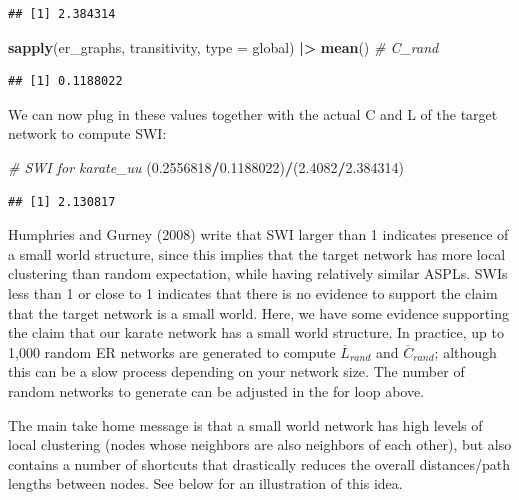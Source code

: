 \documentclass[
]{book}
\newenvironment{Shaded}{\begin{snugshade}}{\end{snugshade}}
\newcommand{\AttributeTok}[1]{\textcolor[rgb]{0.13,0.29,0.53}{#1}}
\newcommand{\CommentTok}[1]{\textcolor[rgb]{0.56,0.35,0.01}{\textit{#1}}}
\newcommand{\FloatTok}[1]{\textcolor[rgb]{0.00,0.00,0.81}{#1}}
\newcommand{\FunctionTok}[1]{\textcolor[rgb]{0.13,0.29,0.53}{\textbf{#1}}}
\newcommand{\NormalTok}[1]{#1}
\newcommand{\SpecialCharTok}[1]{\textcolor[rgb]{0.81,0.36,0.00}{\textbf{#1}}}
\newcommand{\StringTok}[1]{\textcolor[rgb]{0.31,0.60,0.02}{#1}}
\begin{document}
\begin{verbatim}
## [1] 2.384314
\end{verbatim}

\begin{Shaded}
\begin{Highlighting}[]
\FunctionTok{sapply}\NormalTok{(er\_graphs, transitivity, }\AttributeTok{type =} \StringTok{\textquotesingle{}global\textquotesingle{}}\NormalTok{) }\SpecialCharTok{|\textgreater{}} \FunctionTok{mean}\NormalTok{() }\CommentTok{\# C\_rand}
\end{Highlighting}
\end{Shaded}

\begin{verbatim}
## [1] 0.1188022
\end{verbatim}

We can now plug in these values together with the actual C and L of the target network to compute SWI:

\begin{Shaded}
\begin{Highlighting}[]
\CommentTok{\# SWI for karate\_uu }
\NormalTok{(}\FloatTok{0.2556818}\SpecialCharTok{/}\FloatTok{0.1188022}\NormalTok{)}\SpecialCharTok{/}\NormalTok{(}\FloatTok{2.4082}\SpecialCharTok{/}\FloatTok{2.384314}\NormalTok{)}
\end{Highlighting}
\end{Shaded}

\begin{verbatim}
## [1] 2.130817
\end{verbatim}

Humphries and Gurney (2008) write that SWI larger than 1 indicates presence of a small world structure, since this implies that the target network has more local clustering than random expectation, while having relatively similar ASPLs. SWIs less than 1 or close to 1 indicates that there is no evidence to support the claim that the target network is a small world. Here, we have some evidence supporting the claim that our karate network has a small world structure. In practice, up to 1,000 random ER networks are generated to compute \(\overline L_{rand}\) and \(\overline C_{rand}\); although this can be a slow process depending on your network size. The number of random networks to generate can be adjusted in the for loop above.

The main take home message is that a small world network has high levels of local clustering (nodes whose neighbors are also neighbors of each other), but also contains a number of shortcuts that drastically reduces the overall distances/path lengths between nodes. See below for an illustration of this idea.
\end{document}
